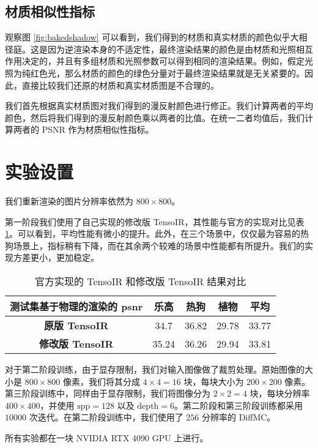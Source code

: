 \subsection{材质相似性指标}

观察图 \ref{fig:bakedshadow} 可以看到，我们得到的材质和真实材质的颜色似乎大相径庭。这是因为逆渲染本身的不适定性，最终渲染结果的颜色是由材质和光照相互作用决定的，并且有多组材质和光照参数可以得到相同的渲染结果。例如，假定光照为纯红色光，那么材质的颜色的绿色分量对于最终渲染结果就是无关紧要的。因此，直接比较我们还原的材质和真实材质图是不合理的。

我们首先根据真实材质图对我们得到的漫反射颜色进行修正。我们计算两者的平均颜色，然后将我们得到的漫反射颜色乘以两者的比值。在统一二者均值后，我们计算两者的 PSNR 作为材质相似性指标。

\newpage
\section{实验设置}

我们重新渲染的图片分辨率依然为 $800 \times 800$。

第一阶段我们使用了自己实现的修改版 TensoIR，其性能与官方的实现对比见表\ref{tab:tensoir}。可以看到，平均性能有微小的提升。此外，在三个场景中，仅仅最为容易的热狗场景上，指标稍有下降，而在其余两个较难的场景中性能都有所提升。我们的实现方差更小，更加稳定。
\begin{table}[h]
  \centering
  \begin{tabular}{ccccc}
  \toprule
  \textbf{测试集基于物理的渲染的 psnr} & 乐高  & 热狗 & 植物 & 平均 \\
  \midrule
  \textbf{原版 TensoIR}   & 34.7  & 36.82  & 29.78 & 33.77 \\
  \textbf{修改版 TensoIR} & 35.24 & 36.26  & 29.94 & 33.81 \\
  \bottomrule
  \end{tabular}
  \caption{官方实现的 TensoIR 和修改版 TensoIR 结果对比}
  \label{tab:tensoir}
\end{table}

对于第二阶段训练，由于显存限制，我们对输入图像做了裁剪处理。原始图像的大小是 $800 \times 800$ 像素，我们将其分成 $4 \times 4 = 16$ 块，每块大小为 $200 \times 200$ 像素。第三阶段训练中，同样由于显存限制，我们将图像分为 $2\times 2=4$ 块，每块分辨率 $400 \times 400$，并使用 $\text{spp}=128$ 以及 $\mathrm{depth}=6$。第二阶段和第三阶段训练都采用 $10000$ 次迭代。在第二阶段训练中，我们使用了 $256$ 分辨率的 DiffMC。

所有实验都在一块 NVIDIA RTX 4090 GPU 上进行。

